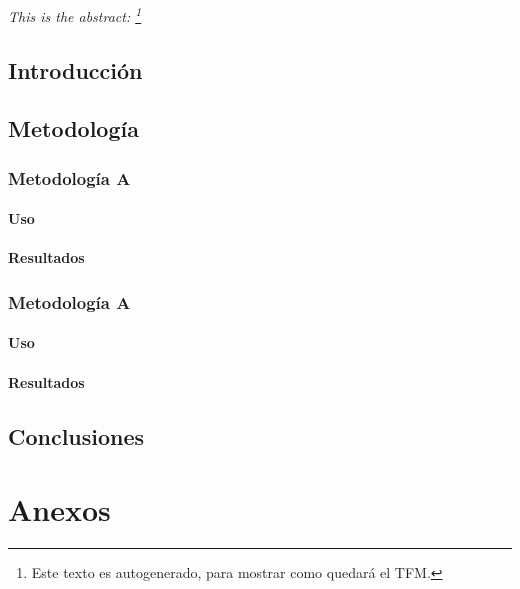 \documentclass[a4paper,12pt]{report}
\begin{document}

\par\textit{This is the abstract: \lipsum[1]\parencite{Loremips46:online}\footnote{Este texto es autogenerado, para mostrar como quedará el TFM.}}


\clearpage
\tableofcontents

\chapter{Introducción}
\lipsum[2]

\chapter{Metodología}
\lipsum[3]
\section{Metodología A}
\lipsum[4]
\subsection{Uso}
\lipsum[5]
\subsection{Resultados}
\lipsum[6]
\section{Metodología A}
\lipsum[7]
\subsection{Uso}
\lipsum[8]
\subsection{Resultados}
\lipsum[9]

\chapter{Conclusiones}
\lipsum[10]

\part{Anexos}

\newpage
\listoftables
\listoffigures

\printbibliography
\end{document}
